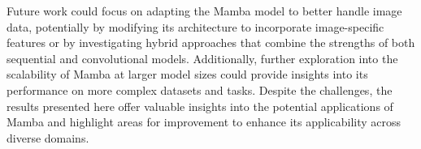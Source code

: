 \documentclass[onecolumn]{IEEEtran}
\begin{document}
Future work could focus on adapting the Mamba model to better handle image data, potentially by modifying its architecture to incorporate image-specific features or by investigating hybrid approaches that combine the strengths of both sequential and convolutional models. Additionally, further exploration into the scalability of Mamba at larger model sizes could provide insights into its performance on more complex datasets and tasks. Despite the challenges, the results presented here offer valuable insights into the potential applications of Mamba and highlight areas for improvement to enhance its applicability across diverse domains.




\end{document}
